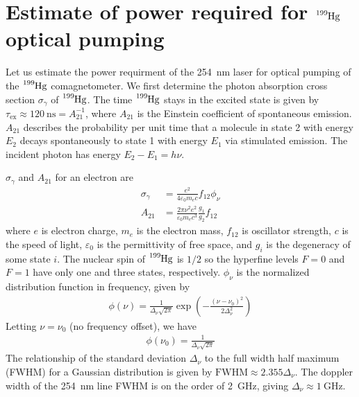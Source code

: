 
\chapter{
    \texorpdfstring{Estimate of power required for $\ce{^{199}Hg}$ optical pumping}
    {Estimate of power required for 199Hg optical pumping}\label{appx:199hg_pumping}
}


Let us estimate the power requirment of the \qty{254}{\nano\meter} laser for optical pumping of the $\ce{^199Hg}$ comagnetometer. We first determine the photon absorption cross section $\sigma_\gamma$ of $\ce{^199Hg}$. The time $\ce{^199Hg}$ stays in the excited state is given by $\tau_\text{ex}\approx \qty{120}{\nano\s}=A_{21}^{-1}$, where $A_{21}$ is the Einstein coefficient \cite{Hilborn1982} of spontaneous emission. $A_{21}$ describes the probability per unit time that a molecule in state 2 with energy $E_2$ decays spontaneously to state 1 with energy $E_1$ via stimulated emission. The incident photon has energy $E_2-E_1=h\nu$.

$\sigma_\gamma$ and $A_{21}$ for an electron are \cite{Hilborn1982}
%
\begin{align}
    \sigma_\gamma&=\frac{e^2}{4\varepsilon_0 m_e c}f_{12}\phi_\nu \label{eq:199hg_pumping_1}\\
    A_{21} &= \frac{2\pi \nu^2 e^2}{\varepsilon_0m_ec^3}\frac{g_1}{g_2}f_{12}\label{eq:199hg_pumping_2}
\end{align}
%
where $e$ is electron charge, $m_e$ is the electron mass, $f_{12}$ is oscillator strength, $c$ is the speed of light, $\varepsilon_0$ is the permittivity of free space, and $g_i$ is the degeneracy of some state $i$. The nuclear spin of $\ce{^199Hg}$ is $1/2$ so the hyperfine levels $F=0$ and $F=1$ have only one and three states, respectively. $\phi_\nu$ is the normalized distribution function in frequency, given by
%
\begin{gather}
    \phi(\nu)=\frac{1}{\Delta_\nu \sqrt{2\pi}}\exp \left( - \frac{(\nu-\nu_0)^2}{2\Delta^2_\nu}\right)
\end{gather}
%
Letting $\nu=\nu_0$ (no frequency offset), we have
%
\begin{gather}
    \phi(\nu_0)=\frac{1}{\Delta_\nu\sqrt{2\pi}}\label{eq:199hg_pumping_3}
\end{gather}
%
The relationship of the standard deviation $\Delta_\nu$ to the full width half maximum (FWHM) for a Gaussian distribution is given by $\text{FWHM}\approx 2.355\Delta_\nu$. The doppler width of the \qty{254}{\nano\meter} line FWHM is on the order of \qty{2}{\giga\Hz}, giving $\Delta_\nu\approx \qty{1}{\giga\Hz}$.

